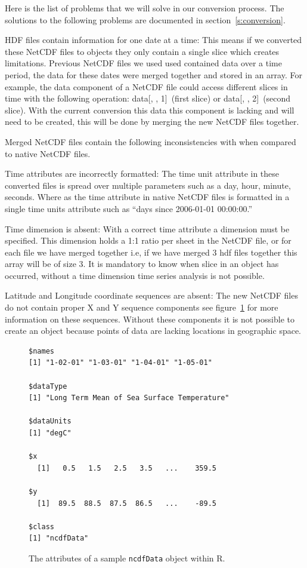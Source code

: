 \documentclass[11pt]{report}
\begin{document}
Here is the list of problems that we will solve in our conversion process.
The solutions to the following problems are documented in section~\ref{s:conversion}.

HDF files contain information for one date at a time:
This means if we converted these NetCDF files to  objects they only contain a single slice which creates limitations.
Previous NetCDF files we used used contained data over a time period, the data for these dates were merged together and stored in an array.
For example, the data component of a NetCDF file could access different slices in time with the following operation:
data[, , 1]~(first slice) or data[, , 2]~(second slice).
With the current conversion this data this component is lacking and will need to be created, this will be done by merging the new NetCDF files together.

Merged NetCDF files contain the following inconsistencies with when compared to native NetCDF files.

Time attributes are incorrectly formatted:
The time unit attribute in these converted files is spread over multiple parameters such as a day, hour, minute, seconds.
Where as the time attribute in native NetCDF files is formatted in a single time units attribute such as ``days since 2006-01-01 00:00:00.''

Time dimension is absent:
With a correct time attribute a dimension must be specified.
This dimension holds a 1:1 ratio per sheet in the NetCDF file, or for each file we have merged together i.e, if we have merged 3 hdf files together this array will be of size 3.
It is mandatory to know when slice in an  object has occurred, without a time dimension time series analysis is not possible.

Latitude and Longitude coordinate sequences are absent:
The new NetCDF files do not contain proper X and Y sequence components see figure~\ref{fig:attributes} for more information on these sequences.
Without these components it is not possible to create an  object because points of data are lacking locations in geographic space. 

\begin{figure}[!h]
  \centering
  \begin{minipage}[b]{0.5\linewidth}
\begin{Verbatim}[fontsize=\small]
$names
[1] "1-02-01" "1-03-01" "1-04-01" "1-05-01"

$dataType
[1] "Long Term Mean of Sea Surface Temperature"

$dataUnits
[1] "degC"

$x
  [1]   0.5   1.5   2.5   3.5   ...    359.5

$y
  [1]  89.5  88.5  87.5  86.5   ...    -89.5

$class
[1] "ncdfData"  
\end{Verbatim}
  \end{minipage}
\caption{The attributes of a sample \texttt{ncdfData} object within R.}
\label{fig:attributes}
\end{figure}
\end{document}
